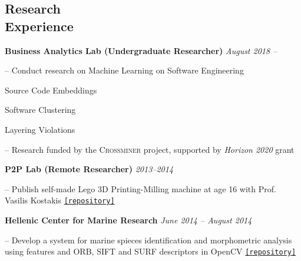 \documentclass[margin]{res}
\begin{document}
\begin{resume}
\section{Research \\ Experience}

\textbf{Business Analytics Lab (Undergraduate Researcher)} \hfill \emph{August 2018 --}
\begin{compactitem}
\item[--] Conduct research on Machine Learning on Software Engineering
\begin{compactitem}
\item Source Code Embeddings
\item Software Clustering
\item Layering Violations
\end{compactitem}
\item[--] Research funded by the \textsc{Crossminer} project, supported by \emph{Horizon 2020} grant
\end{compactitem}

\textbf{P2P Lab (Remote Researcher)} \hfill \emph{2013--2014}

\begin{compactitem}

\item[--] Publish self-made Lego 3D Printing-Milling machine at age 16 with Prof. Vasilis Kostakis \href{https://github.com/papachristoumarios/lego-mindstorms-3d-printing-milling-machine}{\nolinkurl{[repository]}}
\end{compactitem}

\textbf{Hellenic Center for Marine Research} \hfill \emph{June 2014 -- August 2014}
\begin{compactitem}
\item[--] Develop a system for marine spieces identification and morphometric analysis using features and ORB, SIFT and SURF descriptors in OpenCV \href{https://github.com/papachristoumarios/triton-fpr}{\nolinkurl{[repository]}}
\end{compactitem}
 


\end{resume}
\end{document}
